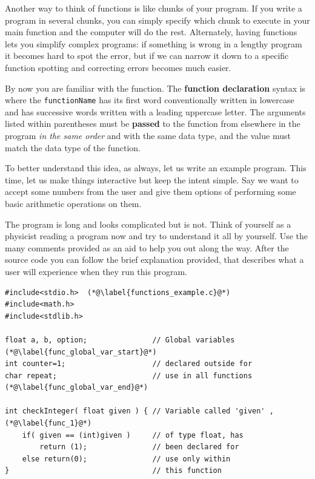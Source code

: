 \documentclass[11pt,oneside]{article}
\begin{document}
{{{{{{{{{Another way to think of functions is like chunks of your program. If you write a program in several chunks, you can simply specify which chunk to execute in your main function and the computer will do the rest. Alternately, having functions lets you simplify complex programs: if something is wrong in a lengthy program it becomes hard to spot the error, but if we can narrow it down to a specific function spotting and correcting errors becomes much easier.

By now you are familiar with the  function. The \textbf{function declaration} syntax is  where the \verb+functionName+ has its first word conventionally written in lowercase and has successive words written with a leading uppercase letter. The arguments listed within parentheses must be \textbf{passed} to the function from elsewhere in the program \textit{in the same order} and with the same data type, and the  value must match the data type of the function.

To better understand this idea, as always, let us write an example program. This time, let us make things interactive but keep the intent simple. Say we want to accept some numbers from the user and give them options of performing some basic arithmetic operations on them.

The program is long and looks complicated but is not. Think of yourself as a physicist reading a program now and try to understand it all by yourself. Use the many comments provided as an aid to help you out along the way. After the source code you can follow the brief explanation provided, that describes what a user will experience when they run this program.\\[-0.75cm]

\begin{lstlisting}
#include<stdio.h>  (*@\label{functions_example.c}@*)
#include<math.h>
#include<stdlib.h>

float a, b, option;               // Global variables (*@\label{func_global_var_start}@*)
int counter=1;                    // declared outside for
char repeat;                      // use in all functions (*@\label{func_global_var_end}@*)

int checkInteger( float given ) { // Variable called 'given' , (*@\label{func_1}@*)
    if( given == (int)given )     // of type float, has
        return (1);               // been declared for
    else return(0);               // use only within
}                                 // this function


\end{lstlisting}}}}}}}}}}
\end{document}
